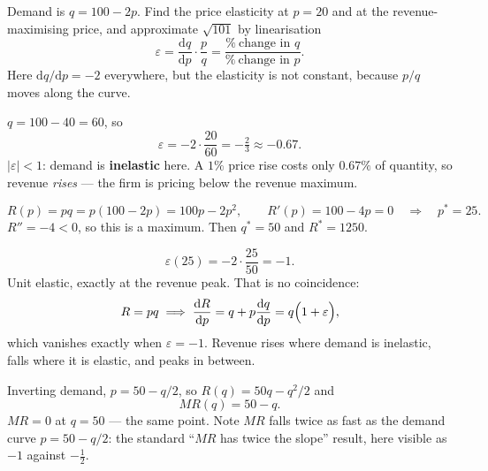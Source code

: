 \begin{worked}{Demand is $q=100-2p$. Find the price elasticity at $p=20$ and at the revenue-maximising price, and approximate $\sqrt{101}$ by linearisation}
\[
  \varepsilon=\frac{\mathrm{d}q}{\mathrm{d}p}\cdot\frac{p}{q}
   =\frac{\%\ \text{change in }q}{\%\ \text{change in }p} .
\]
Here $\mathrm{d}q/\mathrm{d}p=-2$ everywhere, but the elasticity is not
constant, because $p/q$ moves along the curve.

$q=100-40=60$, so
\[
  \varepsilon=-2\cdot\frac{20}{60}=-\tfrac23\approx-0.67 .
\]
$|\varepsilon|<1$: demand is \textbf{inelastic} here. A $1\%$ price rise
costs only $0.67\%$ of quantity, so revenue \emph{rises} --- the firm is
pricing below the revenue maximum.

\[
  R(p)=pq=p(100-2p)=100p-2p^{2},
  \qquad
  R'(p)=100-4p=0
  \quad\Longrightarrow\quad
  p^{*}=25 .
\]
$R''=-4<0$, so this is a maximum. Then $q^{*}=50$ and $R^{*}=1250$.

\[
  \varepsilon(25)=-2\cdot\frac{25}{50}=-1 .
\]
Unit elastic, exactly at the revenue peak. That is no coincidence:
\[
  R=pq
  \;\Longrightarrow\;
  \frac{\mathrm{d}R}{\mathrm{d}p}=q+p\frac{\mathrm{d}q}{\mathrm{d}p}
  =q\Bigl(1+\varepsilon\Bigr),
\]
which vanishes exactly when $\varepsilon=-1$. Revenue rises where demand is
inelastic, falls where it is elastic, and peaks in between.

Inverting demand, $p=50-q/2$, so $R(q)=50q-q^{2}/2$ and
\[
  MR(q)=50-q .
\]
$MR=0$ at $q=50$ --- the same point. Note $MR$ falls twice as fast as the
demand curve $p=50-q/2$: the standard ``$MR$ has twice the slope'' result,
here visible as $-1$ against $-\tfrac12$.


\end{worked}
